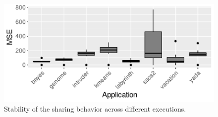 \begin{figure}[!t]
	\centering
	\includegraphics[width=\fullImageWidth\textwidth]{figures/sharingBehavior/FirstQ/0.graph.pdf}
	\caption{Stability of the sharing behavior across different executions.}
	\label{fig:averageFirstQ}
\end{figure}

